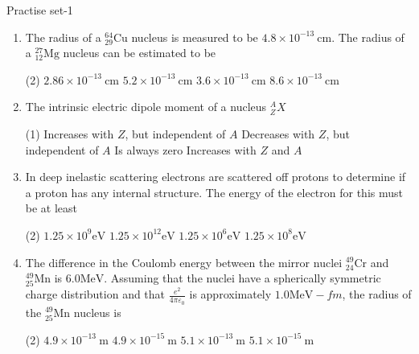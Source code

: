 \newpage
\begin{abox}
	Practise set-1
\end{abox}
\begin{enumerate}
	\item  The radius of a ${ }_{29}^{64} \mathrm{Cu}$ nucleus is measured to be $4.8 \times 10^{-13} \mathrm{~cm}$. The radius of a ${ }_{12}^{27} \mathrm{Mg}$ nucleus can be estimated to be
	 \begin{tasks}(2)
		\task[\textbf{a.}]$2.86 \times 10^{-13} \mathrm{~cm}$
		\task[\textbf{b.}]$5.2 \times 10^{-13} \mathrm{~cm}$
		\task[\textbf{c.}] $3.6 \times 10^{-13} \mathrm{~cm}$
		\task[\textbf{d.}] $8.6 \times 10^{-13} \mathrm{~cm}$
	\end{tasks}
\item  The intrinsic electric dipole moment of a nucleus ${ }_Z^A X$
	 \begin{tasks}(1)
		\task[\textbf{a.}]Increases with $Z$, but independent of $A$
		\task[\textbf{b.}]Decreases with $Z$, but independent of $A$
		\task[\textbf{c.}]Is always zero
		\task[\textbf{d.}]Increases with $Z$ and $A$
	\end{tasks}
\item  In deep inelastic scattering electrons are scattered off protons to determine if a proton has any internal structure. The energy of the electron for this must be at least
	 \begin{tasks}(2)
		\task[\textbf{a.}]$1.25 \times 10^9 \mathrm{eV}$
		\task[\textbf{b.}]$1.25 \times 10^{12} \mathrm{eV}$
		\task[\textbf{c.}] $1.25 \times 10^6 \mathrm{eV}$
		\task[\textbf{d.}] $1.25 \times 10^8 \mathrm{eV}$
	\end{tasks}
\item  The difference in the Coulomb energy between the mirror nuclei ${ }_{24}^{49} \mathrm{Cr}$ and ${ }_{25}^{49} \mathrm{Mn}$ is $6.0 \mathrm{MeV}$. Assuming that the nuclei have a spherically symmetric charge distribution and that $\frac{e^2}{4 \pi \varepsilon_0}$ is approximately $1.0 \mathrm{MeV}-f m$, the radius of the ${ }_{25}^{49} \mathrm{Mn}$ nucleus is
	 \begin{tasks}(2)
		\task[\textbf{a.}]$4.9 \times 10^{-13} \mathrm{~m}$
		\task[\textbf{b.}]$4.9 \times 10^{-15} \mathrm{~m}$
		\task[\textbf{c.}]$5.1 \times 10^{-13} \mathrm{~m}$
		\task[\textbf{d.}] $5.1 \times 10^{-15} \mathrm{~m}$
	\end{tasks}
\end{enumerate}
\setlength\arrayrulewidth{1pt}
